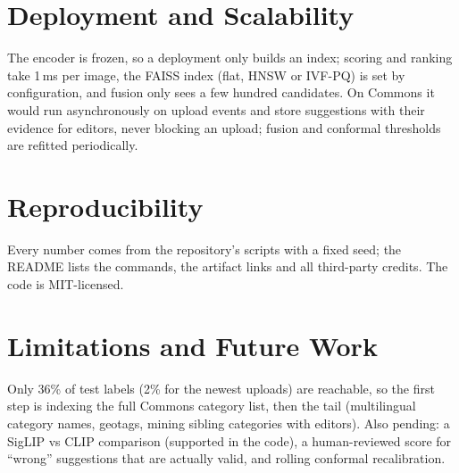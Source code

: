 \documentclass[10pt,twocolumn]{article}
\begin{document}
\section{Deployment and Scalability}
The encoder is frozen, so a deployment only builds an index; scoring and ranking take 1\,ms per image, the
FAISS index (flat, HNSW or IVF-PQ) is set by configuration, and fusion only sees a few hundred candidates.
On Commons it would run asynchronously on upload events and store suggestions with their evidence for
editors, never blocking an upload; fusion and conformal thresholds are refitted periodically.

\section{Reproducibility}
Every number comes from the repository's scripts with a fixed seed; the README lists the commands, the
artifact links and all third-party credits. The code is MIT-licensed.

\section{Limitations and Future Work}
Only 36\% of test labels (2\% for the newest uploads) are reachable, so the first step is indexing the
full Commons category list, then the tail (multilingual category names, geotags, mining sibling categories
with editors). Also pending: a SigLIP vs CLIP comparison (supported in the code), a human-reviewed score
for ``wrong'' suggestions that are actually valid, and rolling conformal recalibration.
\end{document}
